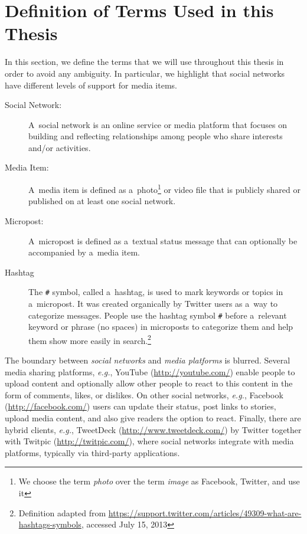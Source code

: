 \section{Definition of Terms Used in this Thesis}
\label{sec:definition}

In this section, we define the terms
that we will use throughout this thesis
in order to avoid any ambiguity.
In particular, we highlight that social networks have
different levels of support for media items.

\begin{description}
  \item[Social Network:]
       A~social network is an online service or media platform
       that focuses on building and reflecting
       relationships among people
       who share interests and/or activities.
  \item[Media Item:]
       A~media item is defined as
       a~photo\footnote{We choose the term \emph{photo}
       over the term \emph{image} as 
       Facebook, Twitter, and \googleplus use it}
       or video file that is publicly shared or published
       on at least one social network.
  \item[Micropost:]
       A~micropost is defined as a~textual status message
       that can optionally be accompanied by a~media item.
  \item[Hashtag] The \texttt{\#} symbol, called a~hashtag,
       is used to mark keywords or topics in a~micropost.
       It was created organically by Twitter users
       as a~way to categorize messages.
       People use the hashtag symbol \texttt{\#} before a~relevant keyword
       or phrase (no spaces) in microposts to categorize them
       and help them show more easily in
       search.\footnote{Definition adapted from
       \url{https://support.twitter.com/articles/49309-what-are-hashtags-symbols},
       accessed July 15, 2013}
\end{description}

The boundary between \emph{social networks} and
\emph{media platforms} is blurred.
Several media sharing platforms, \emph{e.g.},
YouTube (\url{http://youtube.com/})
enable people to upload content
and optionally allow other people to react
to this content in the form of comments, likes, or dislikes.
On other social networks, \emph{e.g.},
Facebook (\url{http://facebook.com/})
users can update their status, post links to stories,
upload media content, and also give readers the option to react.
Finally, there are hybrid clients, \emph{e.g.},
TweetDeck (\url{http://www.tweetdeck.com/})
by Twitter together with
Twitpic (\url{http://twitpic.com/}),
where social networks integrate with media platforms,
typically via third-party applications.

